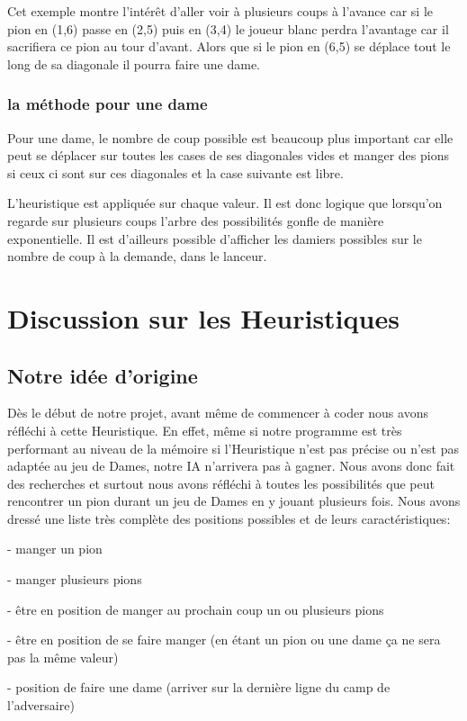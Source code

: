 \documentclass[12,french]{report}
\begin{document}
Cet exemple montre l'intérêt d'aller voir à plusieurs coups à l'avance car si le pion en  (1,6) passe en (2,5) puis en (3,4) le joueur blanc perdra l'avantage car il sacrifiera ce pion au tour d'avant. Alors que si le pion en (6,5) se déplace tout le long de sa diagonale il pourra faire une dame.

\subsection{la méthode pour une dame}
Pour une dame, le nombre de coup possible est beaucoup plus important car elle peut se déplacer sur toutes les cases de ses diagonales vides et manger des pions si ceux ci sont sur ces diagonales et la case suivante est libre.

L'heuristique est appliquée sur chaque valeur. Il est donc logique que lorsqu'on regarde sur plusieurs coups l'arbre des possibilités gonfle de manière exponentielle. Il est d'ailleurs possible d'afficher les damiers possibles sur le nombre de coup à la demande, dans le lanceur.


\chapter{Discussion sur les Heuristiques}
\section{Notre idée d'origine}

Dès le début de notre projet, avant même de commencer à coder nous avons réfléchi à cette Heuristique. En effet, même si notre programme est très performant au niveau de la mémoire si l'Heuristique n'est pas précise ou n'est pas adaptée au jeu de Dames, notre IA n'arrivera pas à gagner.
Nous avons donc fait des recherches et surtout nous avons réfléchi  à toutes les possibilités que peut rencontrer un pion durant un jeu de Dames en y jouant plusieurs fois. Nous avons dressé une liste très complète des positions possibles et de leurs caractéristiques:

- manger un pion

- manger plusieurs pions

- être en position de manger au prochain coup un ou plusieurs pions

- être en position de se faire manger (en étant un pion ou une dame ça ne sera pas la même valeur)

- position de faire une dame (arriver sur la dernière ligne du camp de l'adversaire)
\end{document}
